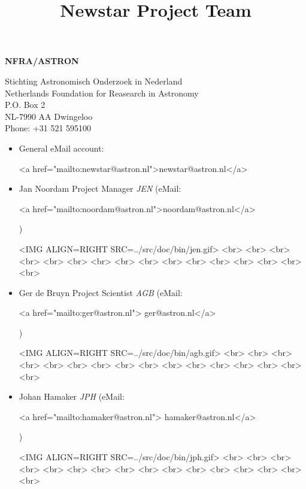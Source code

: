 %
%
%
%
\title{Newstar Project Team}

{\bf NFRA/ASTRON}

Stichting Astronomisch Onderzoek in Nederland \\ 
Netherlands Foundation for Reasearch in Astronomy \\ 
P.O. Box 2 \\ 
NL-7990 AA Dwingeloo \\ 
Phone: +31 521 595100

\begin{itemize}

\item   General eMail account: {\bf
	\begin{rawhtml}
	<a href="mailto:newstar@astron.nl">newstar@astron.nl</a>
	\end{rawhtml}
	}

\item   Jan Noordam      Project Manager        \label{jen} {\it JEN}
	(eMail:
	\begin{rawhtml}
		<a href="mailto:noordam@astron.nl">noordam@astron.nl</a>
	\end{rawhtml}
	)
	\begin{rawhtml}
		<IMG ALIGN=RIGHT SRC=../src/doc/bin/jen.gif>
 		<br>
		<br>
		<br>
		<br>
		<br>
		<br>
		<br>
		<br>
		<br>
		<br>
		<br>
		<br>
		<br>
		<br>
		<br>
		<br>
	\end{rawhtml}

\item   Ger de Bruyn     Project Scientist      \label{agb} {\it AGB}
	(eMail:
	\begin{rawhtml}
		<a href="mailto:ger@astron.nl"> ger@astron.nl</a>
	\end{rawhtml}
	)
	\begin{rawhtml}
		<IMG ALIGN=RIGHT SRC=../src/doc/bin/agb.gif>
		<br>
		<br>
		<br>
		<br>
		<br>
		<br>
		<br>
		<br>
		<br>
		<br>
		<br>
		<br>
		<br>
		<br>
		<br>
		<br>
 	\end{rawhtml}

\item   Johan Hamaker                           \label{jph} {\it JPH}
	(eMail:
	\begin{rawhtml}
		<a href="mailto:hamaker@astron.nl"> hamaker@astron.nl</a>
	\end{rawhtml}
	)
	\begin{rawhtml}
		<IMG ALIGN=RIGHT SRC=../src/doc/bin/jph.gif>
 		<br>
		<br>
		<br>
		<br>
		<br>
		<br>
		<br>
		<br>
		<br>
		<br>
		<br>
		<br>
		<br>
		<br>
		<br>
		<br>
	\end{rawhtml}


\end{itemize}
